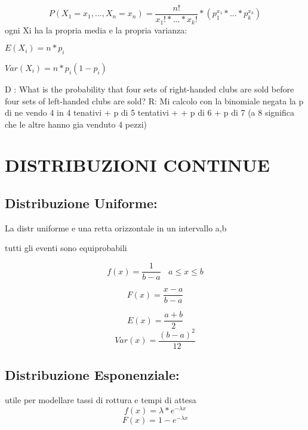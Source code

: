 \documentclass{book}
\begin{document}
\begin{equation}
	P(X_{1}=x_{1},...,X_{n}=x_{n})= \frac{n!}{x_{1}!*...*x_{k}!} * (p_{1}^{x_{1}}*...*p_{k}^{x_{k}})
\end{equation}
ogni Xi ha la propria media e la propria varianza:

$E(X_{i})=n*p_{i}$

$Var(X_{i})=n*p_{i}(1-p_{i})$ 

D : What is the probability that four sets of right-handed
    clubs are sold before four sets of left-handed clubs
    are sold?
R:  Mi calcolo con la binomiale negata la p di ne vendo 4 in 4 tenativi + p di 5 tentativi +
    + p di 6 + p di 7 (a 8 significa che le altre hanno gia venduto 4 pezzi)  


\section{DISTRIBUZIONI CONTINUE}

\subsection{Distribuzione Uniforme:}
La distr uniforme e una retta orizzontale in un intervallo a,b

tutti gli eventi sono equiprobabili

\begin{equation}
	f(x)=\frac{1}{b-a}\ \ \ \ a \le x \le b
\end{equation}

\begin{equation}
	F(x)= \frac{x-a}{b-a}
\end{equation}

\begin{equation}
E(x)= \frac{a+b}{2}
\end{equation}
\begin{equation}
Var(x)= \frac{(b-a)^2}{12}
\end{equation}

\subsection{Distribuzione Esponenziale:}

utile per modellare tassi di rottura e tempi di attesa
\begin{equation}
	f(x)=\lambda*e^{-\lambda x}
\end{equation}
\begin{equation}
	F(x)= 1-e^{-\lambda x}
\end{equation}
\end{document}
